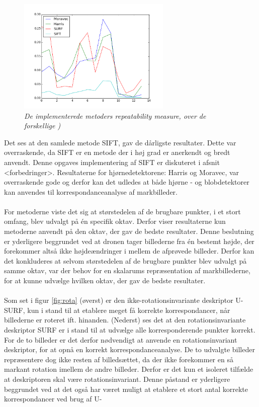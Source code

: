 \begin{figure}[H]
    \centering
    \includegraphics[width=0.65\textwidth]{fig/repeatabilitygraph.png}
     \vspace{-1em}
    \begin{center}        
     \caption{{\footnotesize \textit{
De implementerede metoders repeatability measure, over de forskellige )}}}
    \label{fig:graf}
     \end{center}
       \vspace{-2.5em}
  \end{figure}
\noindent
Det ses at den samlede metode SIFT, gav de dårligste resultater. Dette var overraskende, da SIFT er en metode der i høj grad er anerkendt og bredt anvendt. Denne opgaves implementering af SIFT er diskuteret i afsnit <forbedringer>. Resultaterne for hjørnedetektorene: Harris og Moravec, var overraskende gode og derfor kan det udledes at både hjørne - og blobdetektorer kan anvendes til korrespondanceanalyse af markbilleder.
\\ \\
For metoderne viste det sig at størstedelen af de brugbare punkter, i et stort omfang, blev udvalgt på én specifik oktav. Derfor viser resultaterne kun metoderne anvendt på den oktav, der gav de bedste resultater. Denne beslutning er yderligere beggrundet ved at dronen tager billederne fra én bestemt højde, der forekommer altså ikke højdeændringer i mellem de afprøvede billeder. Derfor kan det konkluderes at selvom størstedelen af de brugbare punkter blev udvalgt på samme oktav, var der behov for en skalarums repræsentation af markbillederne, for at kunne udvælge hvilken oktav, der gav de bedste resultater.
\\ \\
Som set i figur \ref{fig:rota} (øverst) er den ikke-rotationsinvariante deskriptor U-SURF, kun i stand til at etablere meget få korrekte korrespondancer, når billederne er roteret ift. hinanden. (Nederst) ses det at den rotationsinvariante deskriptor SURF er i stand til at udvælge alle korresponderende punkter korrekt. For de to billeder er det derfor nødvendigt at anvende en rotationsinvariant deskriptor, for at opnå en korrekt korrespondanceanalyse. De to udvalgte billeder repræsentere dog ikke resten af billedsættet, da der ikke forekommer en så markant rotation imellem de andre billeder. Derfor er det kun et isoleret tilfælde at deskriptoren skal være rotationsinvariant. Denne påstand er yderligere beggrundet ved at det også har været muligt at etablere et stort antal korrekte korrespondancer ved brug af U-

